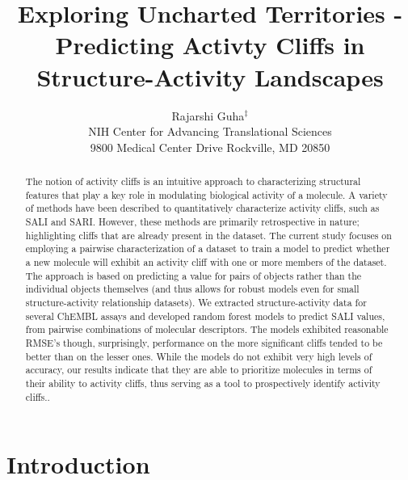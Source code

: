 \documentclass[letterpaper, 12pt]{article}
\begin{document}
\title{Exploring Uncharted Territories - Predicting Activty Cliffs in
  Structure-Activity Landscapes}
\author{Rajarshi Guha${}^{\ddagger}$\\
NIH Center for Advancing Translational Sciences \\ 9800 Medical Center Drive  Rockville, MD 20850}
\date{}

\maketitle
\begin{abstract}
  The notion of activity cliffs is an intuitive approach to characterizing structural features that
  play a key role in modulating biological activity of a molecule. A variety of methods have been
  described to quantitatively characterize activity cliffs, such as SALI and SARI. However, these
  methods are primarily retrospective in nature; highlighting cliffs that are already present in the
  dataset. The current study focuses on employing a pairwise characterization of a dataset to train
  a model to predict whether a new molecule will exhibit an activity cliff with one or more members
  of the dataset. The approach is based on predicting a value for pairs of objects rather than the
  individual objects themselves (and thus allows for robust models even for small structure-activity
  relationship datasets). We extracted structure-activity data for several ChEMBL assays and
  developed random forest models to predict SALI values, from pairwise combinations of molecular
  descriptors. The models exhibited reasonable RMSE's though, surprisingly, performance on the more
  significant cliffs tended to be better than on the lesser ones. While the models do not exhibit
  very high levels of accuracy, our results indicate that they are able to prioritize molecules in
  terms of their ability to activity cliffs, thus serving as a tool to prospectively identify
  activity cliffs..
\end{abstract}

\section{Introduction}
\end{document}
